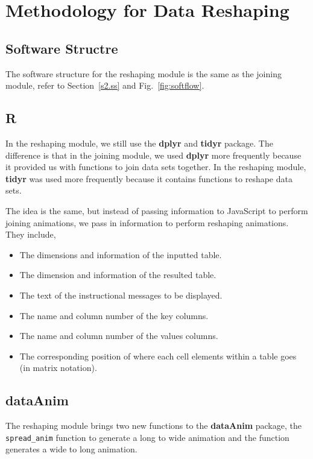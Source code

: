 %
\chapter{Methodology for Data Reshaping} \label{c4} %

\section{Software Structre}

The software structure for the reshaping module is the same as the joining module, refer to Section~\ref{s2.ss} and Fig.~\ref{fig:softflow}.

\section{\textbf{R}}
In the reshaping module, we still use the \textbf{dplyr} and \textbf{tidyr} package. The difference is that in the joining module, we used \textbf{dplyr} more frequently because it provided us with functions to join data sets together. In the reshaping module, \textbf{tidyr} was used more frequently because it contains functions to reshape data sets. 

The idea is the same, but instead of passing information to \textsf{JavaScript} to perform joining animations, we pass in information to perform reshaping animations. They include,

\begin{itemize}
    \item The dimensions and information of the inputted table.
    \item The dimension and information of the resulted table.
    \item The text of the instructional messages to be displayed.
    \item The name and column number of the key columns.
    \item The name and column number of the values columns. 
    \item The corresponding position of where each cell elements within a table goes (in matrix notation).
\end{itemize}

\section{\textbf{dataAnim}}

The reshaping module brings two new functions to the \textbf{dataAnim} package, the \texttt{spread\_anim} function to generate a long to wide animation and the  function generates a wide to long animation. \\

